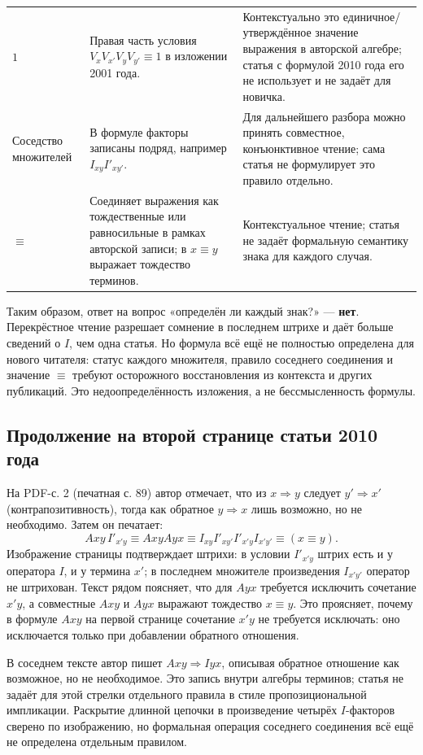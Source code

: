 \documentclass[12pt,a4paper]{article}
\begin{document}
\begin{longtable}{P{0.17\textwidth}P{0.38\textwidth}P{0.35\textwidth}}
$1$ & Правая часть условия $V_xV_{x'}V_yV_{y'}\equiv1$ в изложении 2001 года. & Контекстуально это единичное/утверждённое значение выражения в авторской алгебре; статья с формулой 2010 года его не использует и не задаёт для новичка. \\
Соседство множителей & В формуле факторы записаны подряд, например $I_{xy}I'_{xy'}$. & Для дальнейшего разбора можно принять совместное, конъюнктивное чтение; сама статья не формулирует это правило отдельно. \\
$\equiv$ & Соединяет выражения как тождественные или равносильные в рамках авторской записи; в $x\equiv y$ выражает тождество терминов. & Контекстуальное чтение; статья не задаёт формальную семантику знака для каждого случая. \\
\bottomrule
\end{longtable}

Таким образом, ответ на вопрос «определён ли каждый знак?» — \textbf{нет}. Перекрёстное чтение разрешает сомнение в последнем штрихе и даёт больше сведений о $I$, чем одна статья. Но формула всё ещё не полностью определена для нового читателя: статус каждого множителя, правило соседнего соединения и значение $\equiv$ требуют осторожного восстановления из контекста и других публикаций. Это недоопределённость изложения, а не бессмысленность формулы.

\subsection{Продолжение на второй странице статьи 2010 года}

На PDF-с. 2 (печатная с. 89) автор отмечает, что из \(x\Rightarrow y\) следует \(y'\Rightarrow x'\) (контрапозитивность), тогда как обратное \(y\Rightarrow x\) лишь возможно, но не необходимо. Затем он печатает:
\[
Axy\,I'_{x'y}
\equiv
AxyAyx
\equiv
I_{xy}I'_{xy'}I'_{x'y}I_{x'y'}
\equiv
(x\equiv y).
\]
Изображение страницы подтверждает штрихи: в условии \(I'_{x'y}\) штрих есть и у оператора \(I\), и у термина \(x'\); в последнем множителе произведения \(I_{x'y'}\) оператор не штрихован. Текст рядом поясняет, что для \(Ayx\) требуется исключить сочетание \(x'y\), а совместные \(Axy\) и \(Ayx\) выражают тождество \(x\equiv y\). Это проясняет, почему в формуле \(Axy\) на первой странице сочетание \(x'y\) не требуется исключать: оно исключается только при добавлении обратного отношения.

В соседнем тексте автор пишет \(Axy\Rightarrow Iyx\), описывая обратное отношение как возможное, но не необходимое. Это запись внутри алгебры терминов; статья не задаёт для этой стрелки отдельного правила в стиле пропозициональной импликации. Раскрытие длинной цепочки в произведение четырёх \(I\)-факторов сверено по изображению, но формальная операция соседнего соединения всё ещё не определена отдельным правилом.
\end{document}
